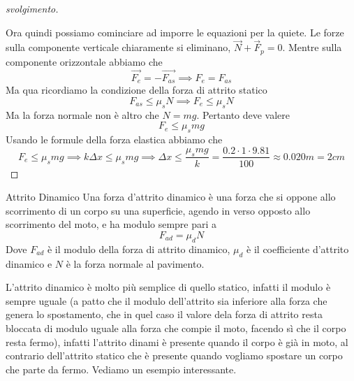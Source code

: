 \documentclass{rapport}
\begin{document}
\begin{proof}[svolgimento]
\begin{figure}[h]
\end{figure}

Ora quindi possiamo cominciare ad imporre le equazioni per la quiete. Le forze sulla componente verticale chiaramente si eliminano, $\vec{N} + \vec{F}_p = 0$. Mentre sulla componente orizzontale abbiamo che 
\[
\vec{F_e} = -\vec{F_{as}} \implies F_e = F_{as}
\]
Ma qua ricordiamo la condizione della forza di attrito statico 
\[
F_{as} \leq \mu_s N \implies F_e \leq \mu_s N
\]
Ma la forza normale non è altro che $N = mg$. Pertanto deve valere 
\[
 F_e \leq \mu_s mg 
\]
Usando le formule della forza elastica abbiamo che 
\[
 F_e \leq \mu_s mg  \implies k\Delta x \leq \mu_s mg \implies \Delta x \leq \dfrac{\mu_s mg}{k}  = \dfrac{0.2 \cdot 1 \cdot 9.81}{100} \approx 0.020 m = 2cm
\]
\end{proof}
\begin{definizione}{Attrito Dinamico}{}
  Una forza d'attrito dinamico è una forza che si oppone allo scorrimento di un corpo su una superficie, agendo in verso opposto allo scorrimento del moto, e ha modulo sempre pari a 
  \[
  F_{ad} =  \mu_d N
  \]
  Dove $F_{ad}$ è il modulo della forza di attrito dinamico, $\mu_d$ è il coefficiente d'attrito dinamico e $N$ è la forza normale al pavimento.
\end{definizione}

L'attrito dinamico è molto più semplice di quello statico, infatti il modulo è sempre uguale (a patto che il modulo dell'attrito sia inferiore alla forza che genera lo spostamento, che in quel caso il valore dela forza di attrito resta bloccata di modulo uguale alla forza che compie il moto, facendo sì che il corpo resta fermo), infatti l'attrito dinami è presente quando il corpo è già in moto, al contrario dell'attrito statico che è presente quando vogliamo spostare un corpo che parte da fermo. Vediamo un esempio interessante. 
\end{document}
